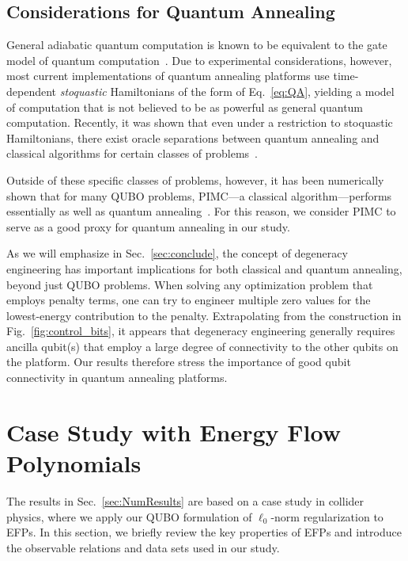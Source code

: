 \documentclass[aps,prd,twocolumn, superscriptaddress,preprintnumbers, nofootinbib,longbibliography,floatfix]{revtex4-2}
\DeclareRobustCommand{\Sec}[1]{Sec.~\ref{#1}}
\DeclareRobustCommand{\Fig}[1]{Fig.~\ref{#1}}
\begin{document}
\subsection{Considerations for Quantum Annealing}


General adiabatic quantum computation is known to be equivalent to the gate model of quantum computation~\cite{farhi2000quantum}.
%
Due to experimental considerations, however, most current implementations of quantum annealing platforms use time-dependent \emph{stoquastic} Hamiltonians of the form of Eq.~\eqref{eq:QA}, yielding a model of computation that is not believed to be as powerful as general quantum computation.
%
Recently, it was shown that even under a restriction to stoquastic Hamiltonians, there exist oracle separations between quantum annealing and classical algorithms for certain classes of problems~\cite{Hastings:2020ubx}.

Outside of these specific classes of problems, however, it has been numerically shown that for many QUBO problems, PIMC---a classical algorithm---performs essentially as well as quantum annealing~\cite{PhysRevLett.117.180402}.
%
For this reason, we consider PIMC to serve as a good proxy for quantum annealing in our study.

As we will emphasize in \Sec{sec:conclude}, the concept of degeneracy engineering has important implications for both classical and quantum annealing, beyond just QUBO problems.
%
When solving any optimization problem that employs penalty terms, one can try to engineer multiple zero values for the lowest-energy contribution to the penalty.
%
Extrapolating from the construction in \Fig{fig:control_bits}, it appears that degeneracy engineering generally requires ancilla qubit(s) that employ a large degree of connectivity to the other qubits on the platform.
%
Our results therefore stress the importance of good qubit connectivity in quantum annealing platforms.


\section{Case Study with Energy Flow Polynomials}\label{sec:efp}

The results in \Sec{sec:NumResults} are based on a case study in collider physics, where we apply our QUBO formulation of $\ell_0$-norm regularization to EFPs.
%
In this section, we briefly review the key properties of EFPs and introduce the observable relations and data sets used in our study.
\end{document}
